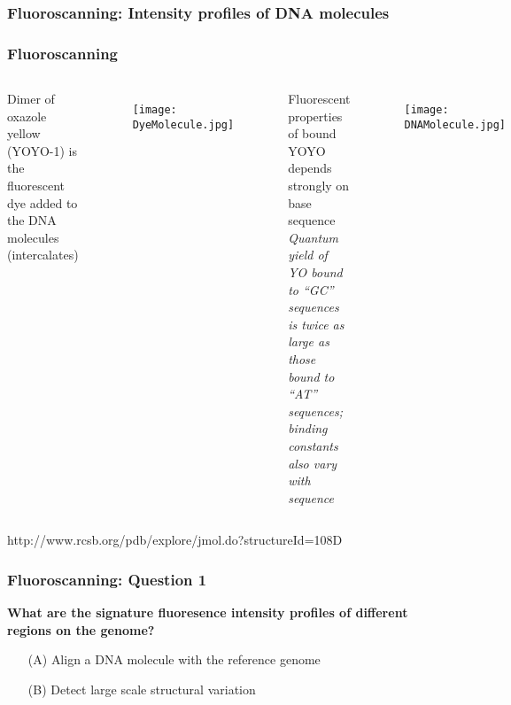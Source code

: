 \documentclass[10pt,dvipsnames,table, notes]{beamer}
\begin{document}
\begin{frame}
\frametitle{Fluoroscanning: Intensity profiles of DNA molecules}
\begin{center}
\end{center}

\end{frame}

\begin{frame}
\frametitle{Fluoroscanning}
\begin{columns}
Dimer of oxazole yellow (YOYO-1) is the fluorescent dye added to the DNA molecules (intercalates) \\
\vspace{0.5cm}
\begin{figure}
\texttt{[image: DyeMolecule.jpg]}
\end{figure}

\pause
{} 
Fluorescent properties of bound YOYO depends strongly on base sequence \\
\vspace{0.5cm}
{\emph{Quantum yield of YO bound to “GC” sequences is twice as large as those bound to “AT” sequences; binding constants also vary with sequence}}
\begin{figure}
\texttt{[image: DNAMolecule.jpg]}
\end{figure}
\end{columns}
\vspace{0.5cm}
http://www.rcsb.org/pdb/explore/jmol.do?structureId=108D
\end{frame}

\begin{frame}
\frametitle{Fluoroscanning: Question 1}
{\bf{\Large{What are the signature fluoresence intensity profiles of different regions on the genome?}}}
\vspace{1cm}
\begin{enumerate}
\item[\textcolor{Apricot}{(A)}] \large{\textcolor{Apricot}{Align a DNA molecule with the reference genome}} 
\vspace{1cm}
\item[\textcolor{Apricot}{(B)}] \large{\textcolor{Apricot}{Detect large scale structural variation }}
\end{enumerate}
\end{frame}
\end{document}
